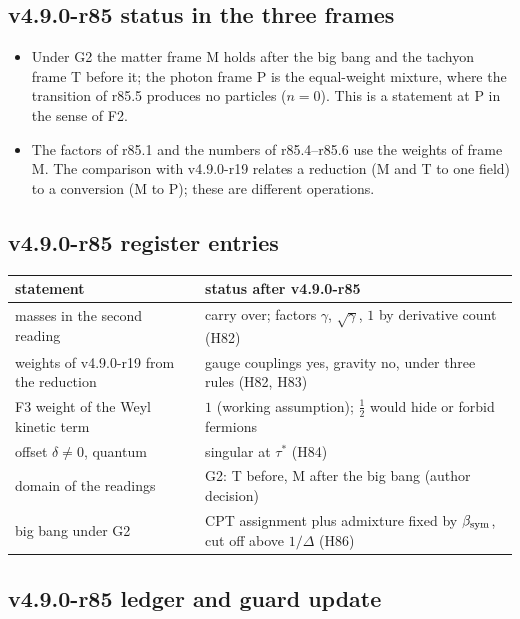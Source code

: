 \subsection*{v4.9.0-r85 status in the three frames}
\label{subsec:v490-r85-frames}

\begin{itemize}[leftmargin=2em]
\item Under G2 the matter frame M holds after the big bang and the tachyon frame T before it; the photon frame P is the equal-weight
mixture, where the transition of r85.5 produces no particles (\(n=0\)).  This is a statement at P in the sense of F2.
\item The factors of r85.1 and the numbers of r85.4--r85.6 use the weights of frame M.  The comparison with v4.9.0-r19 relates a reduction
(M and T to one field) to a conversion (M to P); these are different operations.
\end{itemize}

\subsection*{v4.9.0-r85 register entries}
\label{subsec:v490-r85-register}

\begin{center}
\small
\begin{tabular}{@{}>{\raggedright\arraybackslash}p{}>{\raggedright\arraybackslash}p{}@{}}
\toprule
statement & status after v4.9.0-r85\\
\midrule
masses in the second reading & carry over; factors \(\gamma\), \(\sqrt\gamma\), \(1\) by derivative count (H82)\\
weights of v4.9.0-r19 from the reduction & gauge couplings yes, gravity no, under three rules (H82, H83)\\
F3 weight of the Weyl kinetic term & \(1\) (working assumption); \(\tfrac12\) would hide or forbid fermions\\
offset \(\delta\neq0\), quantum & singular at \(\tau^*\) (H84)\\
domain of the readings & G2: T before, M after the big bang (author decision)\\
big bang under G2 & CPT assignment plus admixture fixed by \(\beta_{\mathrm{sym}}\), cut off above \(1/\Delta\) (H86)\\
\bottomrule
\end{tabular}
\end{center}

\subsection*{v4.9.0-r85 ledger and guard update}
\label{subsec:v490-r85-ledger-guard}

